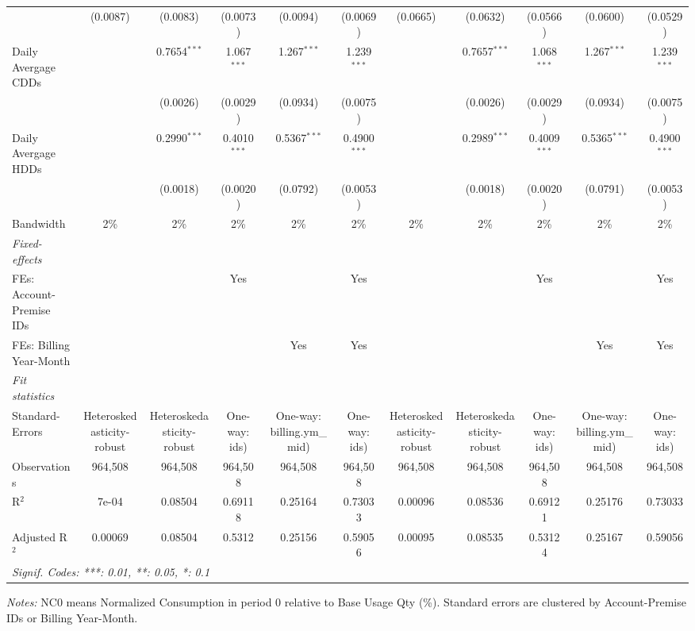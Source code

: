 \begin{table}[htbp]
\begin{tabular}{lcccccccccc}
  &(0.0087) & (0.0083) & (0.0073) & (0.0094) & (0.0069) & (0.0665) & (0.0632) & (0.0566) & (0.0600) & (0.0529)\\
Daily Avergage CDDs&   & 0.7654$^{***}$ & 1.067$^{***}$ & 1.267$^{***}$ & 1.239$^{***}$ &    & 0.7657$^{***}$ & 1.068$^{***}$ & 1.267$^{***}$ & 1.239$^{***}$\\
  &   & (0.0026) & (0.0029) & (0.0934) & (0.0075) &    & (0.0026) & (0.0029) & (0.0934) & (0.0075)\\
Daily Avergage HDDs&   & 0.2990$^{***}$ & 0.4010$^{***}$ & 0.5367$^{***}$ & 0.4900$^{***}$ &    & 0.2989$^{***}$ & 0.4009$^{***}$ & 0.5365$^{***}$ & 0.4900$^{***}$\\
  &   & (0.0018) & (0.0020) & (0.0792) & (0.0053) &    & (0.0018) & (0.0020) & (0.0791) & (0.0053)\\
\midrule Bandwidth & 2\% & 2\% & 2\% & 2\% & 2\% & 2\% & 2\% & 2\% & 2\% & 2\%\\
\midrule
\emph{Fixed-effects}&   &   &   &   &   &   &   &   &   &  \\
FEs: Account-Premise IDs &  &  & Yes &  & Yes &  &  & Yes &  & Yes\\
FEs: Billing Year-Month &  &  &  & Yes & Yes &  &  &  & Yes & Yes\\
\midrule
\emph{Fit statistics}&  & & & & & & & & & \\
Standard-Errors& Heteroskedasticity-robust&Heteroskedasticity-robust&One-way: ids)&One-way: billing.ym\_mid)&One-way: ids)&Heteroskedasticity-robust&Heteroskedasticity-robust&One-way: ids)&One-way: billing.ym\_mid)&One-way: ids)\\
Observations & 964,508&964,508&964,508&964,508&964,508&964,508&964,508&964,508&964,508&964,508\\
R$^2$ & 7e-04&0.08504&0.69118&0.25164&0.73033&0.00096&0.08536&0.69121&0.25176&0.73033\\
Adjusted R$^2$ & 0.00069&0.08504&0.5312&0.25156&0.59056&0.00095&0.08535&0.53124&0.25167&0.59056\\
\bottomrule\bottomrule
\multicolumn{11}{l}{\emph{Signif. Codes: ***: 0.01, **: 0.05, *: 0.1}}\\
\end{tabular}

\emph{\medskip Notes:} NC0 means Normalized Consumption in period 0 relative to Base Usage Qty (\%). Standard errors are clustered by Account-Premise IDs or Billing Year-Month.
\end{table}